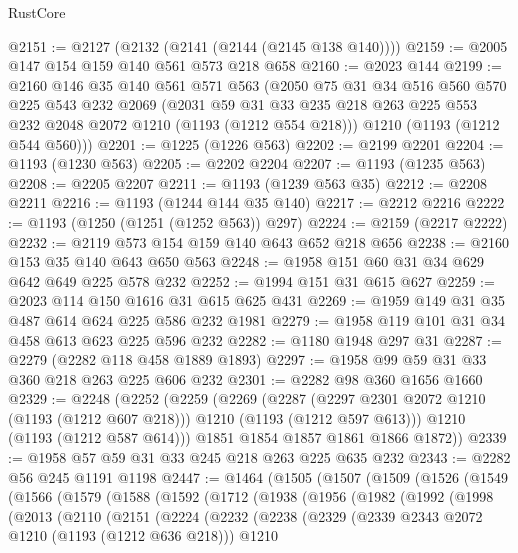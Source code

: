 \begin{lexlean}{RustCore}
\begin{coremodule}
@2151 := @2127 (@2132 (@2141 (@2144 (@2145 @138 @140))))
@2159 := @2005 @147 @154 @159 @140 @561 @573 @218 @658
@2160 := @2023 @144
@2199 := @2160
    @146
    @35
    @140
    @561
    @571
    @563
    (@2050
      @75
      @31
      @34
      @516
      @560
      @570
      @225
      @543
      @232
      @2069
      (@2031 @59 @31 @33 @235 @218 @263 @225 @553 @232 @2048 @2072 @1210 (@1193 (@1212 @554 @218)))
      @1210
      (@1193 (@1212 @544 @560)))
@2201 := @1225 (@1226 @563)
@2202 := @2199 @2201
@2204 := @1193 (@1230 @563)
@2205 := @2202 @2204
@2207 := @1193 (@1235 @563)
@2208 := @2205 @2207
@2211 := @1193 (@1239 @563 @35)
@2212 := @2208 @2211
@2216 := @1193 (@1244 @144 @35 @140)
@2217 := @2212 @2216
@2222 := @1193 (@1250 (@1251 (@1252 @563)) @297)
@2224 := @2159 (@2217 @2222)
@2232 := @2119 @573 @154 @159 @140 @643 @652 @218 @656
@2238 := @2160 @153 @35 @140 @643 @650 @563
@2248 := @1958 @151 @60 @31 @34 @629 @642 @649 @225 @578 @232
@2252 := @1994 @151 @31 @615 @627
@2259 := @2023 @114 @150 @1616 @31 @615 @625 @431
@2269 := @1959 @149 @31 @35 @487 @614 @624 @225 @586 @232 @1981
@2279 := @1958 @119 @101 @31 @34 @458 @613 @623 @225 @596 @232
@2282 := @1180 @1948 @297 @31
@2287 := @2279 (@2282 @118 @458 @1889 @1893)
@2297 := @1958 @99 @59 @31 @33 @360 @218 @263 @225 @606 @232
@2301 := @2282 @98 @360 @1656 @1660
@2329 := @2248
    (@2252
      (@2259
        (@2269
          (@2287
            (@2297 @2301 @2072 @1210 (@1193 (@1212 @607 @218)))
            @1210
            (@1193 (@1212 @597 @613)))
          @1210
          (@1193 (@1212 @587 @614)))
        @1851
        @1854
        @1857
        @1861
        @1866
        @1872))
@2339 := @1958 @57 @59 @31 @33 @245 @218 @263 @225 @635 @232
@2343 := @2282 @56 @245 @1191 @1198
@2447 := @1464
    (@1505
      (@1507
        (@1509
          (@1526
            (@1549
              (@1566
                (@1579
                  (@1588
                    (@1592
                      (@1712
                        (@1938
                          (@1956
                            (@1982
                              (@1992
                                (@1998
                                  (@2013
                                    (@2110
                                      (@2151
                                        (@2224
                                          (@2232
                                            (@2238
                                              (@2329
                                                (@2339 @2343 @2072 @1210 (@1193 (@1212 @636 @218)))
                                                @1210

\end{coremodule}
\end{lexlean}
